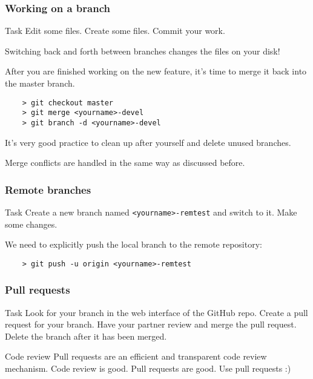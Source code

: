 \begin{frame}[fragile]
	\frametitle{Working on a branch}
	
	\begin{block}{Task}
	Edit some files. Create some files. Commit your work.
	\end{block}	
	
	Switching back and forth between branches changes the files on your disk!
	
	After you are finished working on the new feature, it's time to merge it back into the master branch.
	\begin{verbatim}
	> git checkout master
	> git merge <yourname>-devel
	> git branch -d <yourname>-devel
	\end{verbatim}
	It's very good practice to clean up after yourself and delete unused branches.
	
	Merge conflicts are handled in the same way as discussed before.
\end{frame}


\begin{frame}[fragile]
	\frametitle{Remote branches}
	
	\begin{block}{Task}
	Create a new branch named \texttt{<yourname>-remtest} and switch to it. Make some changes.
	\end{block}	

	We need to explicitly push the local branch to the remote repository:
	\begin{verbatim}
	> git push -u origin <yourname>-remtest
	\end{verbatim}	
	
\end{frame}


\begin{frame}[fragile]
	\frametitle{Pull requests}
	
	\begin{block}{Task}
	Look for your branch in the web interface of the GitHub repo. Create a pull request for your branch. Have your partner review and merge the pull request. Delete the branch after it has been merged.
	\end{block}	

	\begin{block}{Code review}
	Pull requests are an efficient and transparent code review mechanism. Code review is good. Pull requests are good. Use pull requests :)
	\end{block}
\end{frame}

